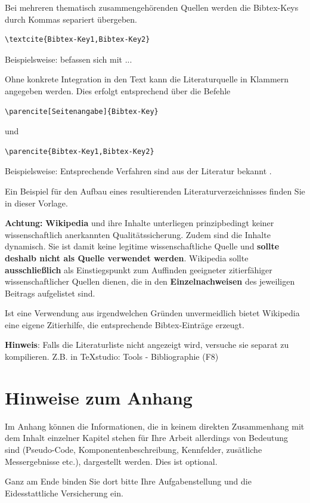Bei mehreren thematisch zusammengehörenden Quellen werden die Bibtex-Keys durch Kommas separiert übergeben.
\begin{verbatim}\textcite{Bibtex-Key1,Bibtex-Key2}\end{verbatim} 
Beispielsweise: \textcite{Book3, InProc4} befassen sich mit ...

Ohne konkrete Integration in den Text kann die Literaturquelle in Klammern angegeben werden. Dies erfolgt entsprechend über die Befehle 
\begin{verbatim}\parencite[Seitenangabe]{Bibtex-Key}\end{verbatim} 
und 
\begin{verbatim}\parencite{Bibtex-Key1,Bibtex-Key2}\end{verbatim} 
Beispielsweise: Entsprechende Verfahren sind aus der Literatur bekannt \parencite{Book3,InProc4}.

Ein Beispiel für den Aufbau eines resultierenden Literaturverzeichnisses finden Sie in dieser Vorlage.

\textbf{Achtung:} \textbf{Wikipedia} und ihre Inhalte unterliegen prinzipbedingt keiner wissenschaftlich anerkannten Qualitätssicherung. Zudem sind die Inhalte dynamisch. Sie ist damit keine legitime wissenschaftliche Quelle und \textbf{sollte deshalb nicht als Quelle verwendet werden}. Wikipedia sollte \textbf{ausschließlich} als Einstiegspunkt zum Auffinden geeigneter zitierfähiger wissenschaftlicher Quellen dienen, die in den \textbf{Einzelnachweisen} des jeweiligen Beitrags aufgelistet sind. 

Ist eine Verwendung aus irgendwelchen Gründen unvermeidlich bietet Wikipedia eine eigene \glqq Zitierhilfe\grqq, die entsprechende Bibtex-Einträge erzeugt.

\textbf{Hinweis}: Falls die Literaturliste nicht angezeigt wird, versuche sie separat zu kompilieren. Z.B. in TeXstudio: Tools - Bibliographie (F8)

\section{Hinweise zum Anhang}
\label{hinweise:anhang}

Im Anhang können die Informationen, die in keinem direkten
Zusammenhang mit dem Inhalt einzelner Kapitel stehen für Ihre
Arbeit allerdings von Bedeutung sind (Pseudo-Code,
Komponentenbeschreibung, Kennfelder, zusätliche Messergebnisse etc.), dargestellt werden. Dies ist optional.

Ganz am Ende binden Sie dort bitte Ihre Aufgabenstellung und die Eidesstattliche Versicherung ein.

